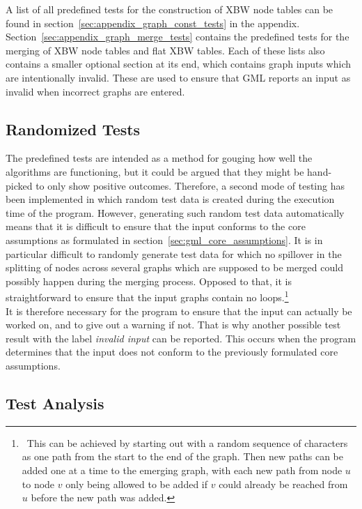 \documentclass[a4paper,12pt,twoside,BCOR=10mm]{scrbook}
\begin{document}
A list of all predefined tests for the construction of XBW node tables can be found
in section~\ref{sec:appendix_graph_const_tests} in the appendix.
Section~\ref{sec:appendix_graph_merge_tests} contains the predefined tests for
the merging of XBW node tables and flat XBW tables.
Each of these lists also contains a smaller optional section at its end,
which contains graph inputs which are intentionally invalid. These are used
to ensure that GML reports an input as invalid when incorrect graphs are entered.

\subsection{Randomized Tests}

The predefined tests are intended as a method for gouging how well the algorithms
are functioning, but it could be argued that they might be hand-picked
to only show positive outcomes.
Therefore, a second mode of testing has been implemented
in which random test data is created during the execution time of the program.
However, generating such random test data automatically means
that it is difficult to ensure that the input conforms
to the core assumptions as formulated in section~\ref{sec:gml_core_assumptions}.
It is in particular difficult to randomly generate test data for which
no spillover in the splitting of nodes across several graphs which are
supposed to be merged could possibly happen during the merging process.
Opposed to that, it is straightforward to ensure that the input graphs
contain no loops.\footnote{\,\,\,This can be achieved by starting out with a
random sequence of characters as one path from the start to the end
of the graph.
Then new paths can be added one at a time to the emerging
graph, with each new path from node $ u $ to node $ v $ only being
allowed to be added if $ v $ could already be reached from $ u $ before
the new path was added.} \\
It is therefore necessary for the program to ensure that the
input can actually be worked on, and to give out a warning if not.
That is why another possible test result with the label \textit{invalid input} can be reported.
This occurs when the program determines that the input does not conform
to the previously formulated core assumptions.

\subsection{Test Analysis}
\end{document}

